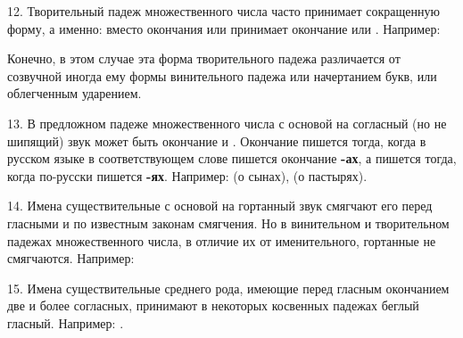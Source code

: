 \documentclass[11pt,a4paper,oneside]{memoir}
\begin{document}
    \bigskip{}

    12. Творительный падеж множественного числа часто принимает сокращенную форму, а именно: вместо окончания {} или {} принимает окончание {} или {}. Например:
    
    \bigskip{}

    Конечно, в этом случае эта форма творительного падежа различается от созвучной иногда ему формы винительного падежа или начертанием букв, или облегченным ударением.
    
    13. В предложном падеже множественного числа с основой на согласный (но не шипящий) звук может быть окончание {} и {}. Окончание {} пишется тогда, когда в русском языке в соответствующем слове пишется окончание \textbf{-ах}, а {} пишется тогда, когда по-русски пишется \textbf{-ях}. Например: {} (о сынах), {} (о пастырях).
    
    14. Имена существительные с основой на гортанный звук смягчают его перед гласными {} и {} по известным законам смягчения. Но в винительном и творительном падежах множественного числа, в отличие их от именительного, гортанные не смягчаются. Например:
    
    \medskip{}

    15. Имена существительные среднего рода, имеющие перед гласным окончанием две и более согласных, принимают в некоторых косвенных падежах беглый гласный. Например: {}.
    
\end{document}
